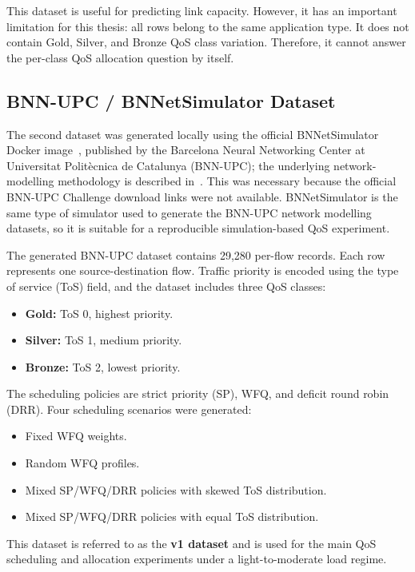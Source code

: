\documentclass[a4paper,12pt]{Classes/RoboticsLaTeX}
\begin{document}
This dataset is useful for predicting link capacity. However, it has an important limitation for this thesis: all rows belong to the same application type. It does not contain Gold, Silver, and Bronze QoS class variation. Therefore, it cannot answer the per-class QoS allocation question by itself.

\subsection{BNN-UPC / BNNetSimulator Dataset}

The second dataset was generated locally using the official BNNetSimulator Docker image~\cite{bnnupc2023bnnetsimulator}, published by the Barcelona Neural Networking Center at Universitat Polit\`ecnica de Catalunya (BNN-UPC); the underlying network-modelling methodology is described in~\cite{ferriolgalmes2022routenetfermi}. This was necessary because the official BNN-UPC Challenge download links were not available. BNNetSimulator is the same type of simulator used to generate the BNN-UPC network modelling datasets, so it is suitable for a reproducible simulation-based QoS experiment.

The generated BNN-UPC dataset contains 29,280 per-flow records. Each row represents one source-destination flow. Traffic priority is encoded using the type of service (ToS) field, and the dataset includes three QoS classes:

\begin{itemize}
    \item \textbf{Gold:} ToS 0, highest priority.
    \item \textbf{Silver:} ToS 1, medium priority.
    \item \textbf{Bronze:} ToS 2, lowest priority.
\end{itemize}

The scheduling policies are strict priority (SP), WFQ, and deficit round robin (DRR). Four scheduling scenarios were generated:

\begin{itemize}
    \item Fixed WFQ weights.
    \item Random WFQ profiles.
    \item Mixed SP/WFQ/DRR policies with skewed ToS distribution.
    \item Mixed SP/WFQ/DRR policies with equal ToS distribution.
\end{itemize}

This dataset is referred to as the \textbf{v1 dataset} and is used for the main QoS scheduling and allocation experiments under a light-to-moderate load regime.
\end{document}

